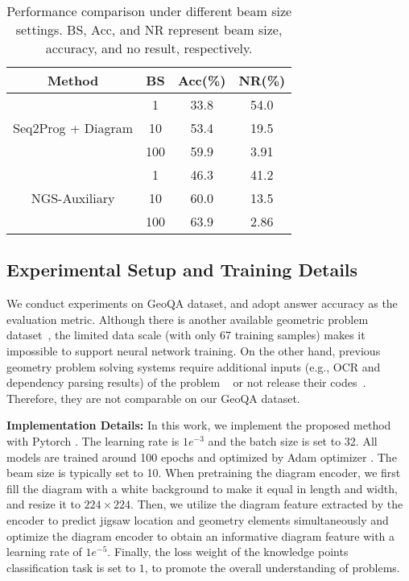 \documentclass[11pt,a4paper]{article}
\begin{document}
\begin{table}[htbp]
\centering
\resizebox{0.9\linewidth}{!} {
\begin{tabular}{c|c|c|c}
\hline
Method & BS & Acc(\%) & NR(\%) \\
\hline
\hline
 & 1 & 33.8 & 54.0 \\
 Seq2Prog + Diagram & 10 & 53.4 & 19.5 \\
& 100 & 59.9 & 3.91 \\
\hline
& 1 & 46.3 & 41.2 \\
NGS-Auxiliary & 10 & 60.0 & 13.5 \\
& 100 & 63.9 & 2.86 \\
\hline
\end{tabular}
}
\caption{Performance comparison under different beam size settings. BS, Acc, and NR represent beam size, accuracy, and no result, respectively.}
\label{table-beam}
\end{table}






\subsection{Experimental Setup and Training Details }

We conduct experiments on GeoQA dataset, and adopt answer accuracy as the evaluation metric. Although there is another  available geometric problem dataset~\cite{seo2015solving}, the limited data scale (with only 67 training samples) makes it impossible to support neural network training. On the other hand, previous geometry problem solving systems require additional inputs (e.g.,  OCR and dependency parsing results) of the problem ~\cite{jgex, seo-etal-2015-solving} or not release their codes~\cite{sachan2017learning,sachan2020knowledge}. Therefore, they are not comparable on our GeoQA dataset.





 



\textbf{Implementation Details:}
In this work, we implement the proposed method with Pytorch \cite{paszke2017automatic}. 
The learning rate is $1e^{-3}$ and the batch size is set to 32. All models are trained around 100 epochs and optimized by Adam optimizer \cite{kingma2014adam}. The beam size is typically set to 10.
When pretraining the diagram encoder, 
we first fill the diagram with a white background to make it equal in length and width, and resize it to $224 \times 224$.
Then, we utilize the diagram feature extracted by the encoder to predict jigsaw location and geometry elements simultaneously and optimize the diagram encoder to obtain an informative diagram feature with a learning rate of $1e^{-5}$. Finally, the loss weight of the knowledge points classification task is set to $1$, to promote the overall understanding of problems.
\end{document}
